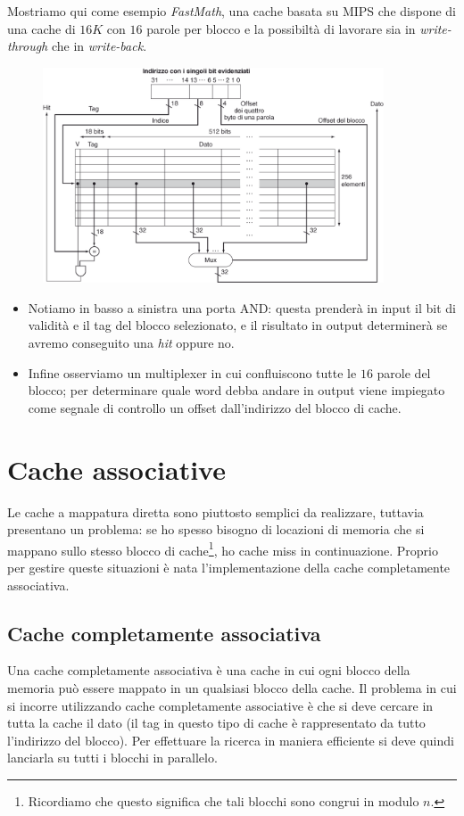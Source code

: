 \documentclass[class=book, crop=false, oneside]{standalone}
\begin{document}
Mostriamo qui come esempio \emph{FastMath}, una cache basata su MIPS che dispone di una cache di \(16K\) con \(16\) parole per blocco e la possibiltà di lavorare sia in \emph{write-through} che in \emph{write-back}.
\begin{figure}[H]
  \centering
  \includegraphics[width=0.9\textwidth,keepaspectratio]{astmips}
\end{figure}
\begin{itemize}
  \item Notiamo in basso a sinistra una porta AND: questa prenderà in input il bit di validità e il tag del blocco selezionato, e il risultato in output determinerà se avremo conseguito una \emph{hit} oppure no.
  \item Infine osserviamo un multiplexer in cui confluiscono tutte le \(16\) parole del blocco; per determinare quale word debba andare in output viene impiegato come segnale di controllo un offset dall'indirizzo del blocco di cache.
\end{itemize}

\section{Cache associative}
Le cache a mappatura diretta sono piuttosto semplici da realizzare, tuttavia presentano un problema: se ho spesso bisogno di locazioni di memoria che si mappano sullo stesso blocco di cache\footnote{Ricordiamo che questo significa che tali blocchi sono congrui in modulo \(n\).}, ho cache miss in continuazione.
Proprio per gestire queste situazioni è nata l'implementazione della cache completamente associativa.

\subsection{Cache completamente associativa}
Una cache completamente associativa è una cache in cui ogni blocco della memoria può essere mappato in un qualsiasi blocco della cache.
Il problema in cui si incorre utilizzando cache completamente associative è che si deve cercare in tutta la cache il dato (il tag in questo tipo di cache è rappresentato da tutto l’indirizzo del blocco).
Per effettuare la ricerca in maniera efficiente si deve quindi lanciarla su tutti i blocchi in parallelo.
\end{document}

